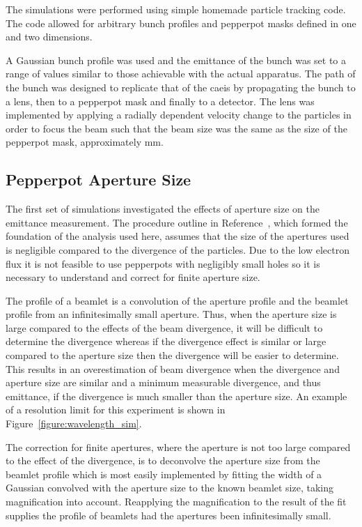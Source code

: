 The simulations were performed using simple homemade particle tracking code.
The code allowed for arbitrary bunch profiles and pepperpot masks defined in one and two dimensions.

A Gaussian bunch profile was used and the emittance of the bunch was set to a range of values similar to those achievable with the actual apparatus.
The path of the bunch was designed to replicate that of the \gls{caeis} by propagating the bunch to a lens, then to a pepperpot mask and finally to a detector.
The lens was implemented by applying a radially dependent velocity change to the particles in order to focus the beam such that the beam size was the same as the size of the pepperpot mask, approximately \unit[2]{mm}.

\subsection{Pepperpot Aperture Size}

The first set of simulations investigated the effects of aperture size on the emittance measurement.
The procedure outline in Reference~\cite{zhang_emittance_1996}, which formed the foundation of the analysis used here, assumes that the size of the apertures used is negligible compared to the divergence of the particles.
Due to the low electron flux it is not feasible to use pepperpots with negligibly small holes so it is necessary to understand and correct for finite aperture size.

The profile of a beamlet is a convolution of the aperture profile and the beamlet profile from an infinitesimally small aperture.
Thus, when the aperture size is large compared to the effects of the beam divergence, it will be difficult to determine the divergence whereas if the divergence effect is similar or large compared to the aperture size then the divergence will be easier to determine.
This results in an overestimation of beam divergence when the divergence and aperture size are similar and a minimum measurable divergence, and thus emittance, if the divergence is much smaller than the aperture size.
An example of a resolution limit for this experiment is shown in Figure~\ref{figure:wavelength_sim}.

The correction for finite apertures, where the aperture is not too large compared to the effect of the divergence, is to deconvolve the aperture size from the beamlet profile which is most easily implemented by fitting the width of a Gaussian convolved with the aperture size to the known beamlet size, taking magnification into account.
Reapplying the magnification to the result of the fit supplies the profile of beamlets had the apertures been infinitesimally small.

